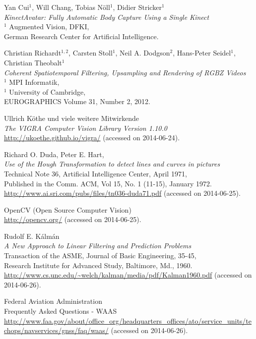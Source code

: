 \documentclass[12pt,a4paper,ngerman]{scrartcl}
\begin{document}
\begin{thebibliography}{99}
Yan Cui$^{1}$, Will Chang, Tobias Nöll$^{1}$, Didier Stricker$^{1}$\\
{\em KinectAvatar: Fully Automatic Body Capture Using a Single Kinect}\\
$^{1}$ Augmented Vision, DFKI,\\
German Research Center for Artificial Intelligence.

Christian Richardt$^{1,2}$, Carsten Stoll$^{1}$, Neil A. Dodgson$^{2}$, Hans-Peter Seidel$^{1}$, Christian Theobalt$^{1}$\\
{\em Coherent Spatiotemporal Filtering, Upsampling and Rendering of RGBZ Videos}\\
$^{1}$ MPI Informatik,\\
$^{1}$ University of Cambridge,\\
EUROGRAPHICS Volume 31, Number 2, 2012.

Ullrich Köthe und viele weitere Mitwirkende\\
{\em The VIGRA Computer Vision Library Version 1.10.0}\\
\url{http://ukoethe.github.io/vigra/} (accessed on 2014-06-24).

Richard O. Duda, Peter E. Hart,\\
{\em Use of the Hough Transformation to detect lines and curves in pictures}\\
Technical Note 36, Artificial Intelligence Center, April 1971,\\
Published in the  Comm. ACM, Vol 15, No. 1 (11-15), January 1972.\\
\url{http://www.ai.sri.com/pubs/files/tn036-duda71.pdf} (accessed on 2014-06-25).

OpenCV (Open Source Computer Vision)\\
\url{http://opencv.org/} (accessed on 2014-06-25).

Rudolf E. Kálmán\\
{\em A New Approach to Linear Filtering and Prediction Problems}\\
Transaction of the ASME, Journal of Basic Engineering, 35-45,\\
Research Institute for Advanced Study, Baltimore, Md., 1960.\\
\url{http://www.cs.unc.edu/~welch/kalman/media/pdf/Kalman1960.pdf} (accessed on 2014-06-26).

Federal Aviation Administration\\
Frequently Asked Questions - WAAS\\
\url{http://www.faa.gov/about/office_org/headquarters_offices/ato/service_units/techops/navservices/gnss/faq/waas/} (accessed on 2014-06-26).


\end{thebibliography}
\end{document}
